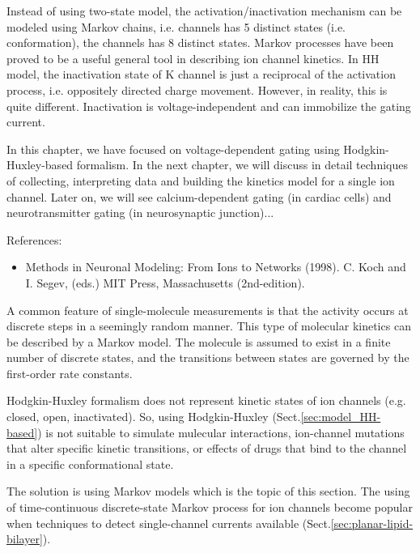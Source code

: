Instead of using two-state model, the activation/inactivation
mechanism can be modeled using Markov chains, i.e.   channels
has 5 distinct states (i.e. conformation), the  channels has 8
distinct states.  Markov processes have been proved to be a useful
general tool in describing ion channel kinetics. In HH model, the
inactivation state of K channel is just a reciprocal of the activation
process, i.e. oppositely directed charge movement. However, in
reality, this is quite different. Inactivation is voltage-independent
and can immobilize the gating current.

In this chapter, we have focused on voltage-dependent gating using
Hodgkin-Huxley-based formalism. In the next chapter, we will discuss in detail
techniques of collecting, interpreting data and building the kinetics model for
a single ion channel. Later on, we will see calcium-dependent gating (in cardiac
cells) and neurotransmitter gating (in neurosynaptic junction)...

References:
\begin{itemize}
\item Methods in Neuronal Modeling: From Ions to Networks
  (1998). C. Koch and I. Segev, (eds.) MIT Press, Massachusetts
  (2nd-edition).
\end{itemize}



A common feature of single-molecule measurements is that the activity
occurs at discrete steps in a seemingly random manner.
This type of molecular kinetics can be described by a Markov model.
The molecule is assumed to exist in a finite number of discrete states, and
the transitions between states are governed by the first-order rate constants.

Hodgkin-Huxley formalism does not represent kinetic states of ion channels (e.g.
closed, open, inactivated). So, using Hodgkin-Huxley
(Sect.\ref{sec:model_HH-based}) is not suitable to simulate mulecular
interactions, ion-channel mutations that alter specific kinetic transitions, or
effects of drugs that bind to the channel in a specific conformational state.

The solution is using Markov models which is the topic of this section.
The using of time-continuous discrete-state Markov process for ion channels
become popular when techniques to detect single-channel currents
available (Sect.\ref{sec:planar-lipid-bilayer}).

